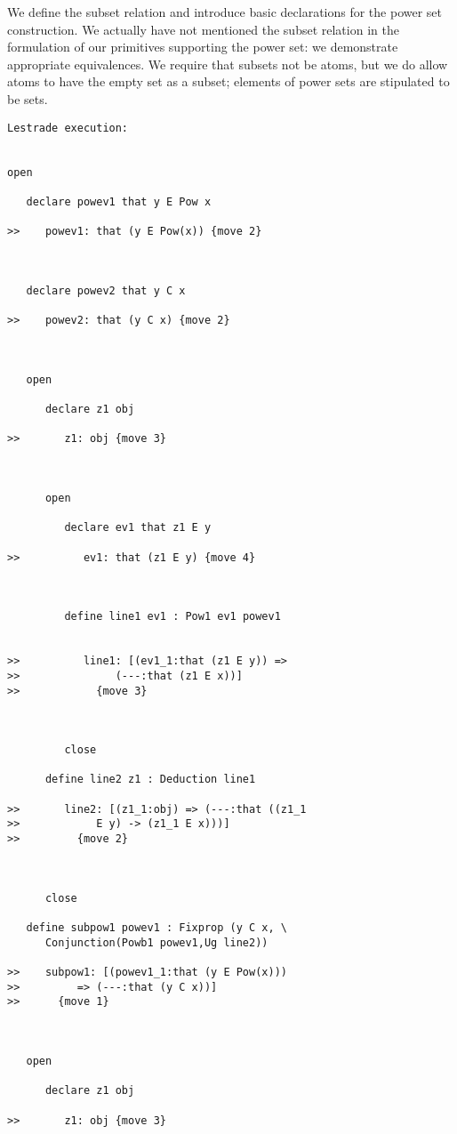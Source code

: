 \documentclass{article}
\begin{document}
We define the subset relation and introduce basic declarations for the power set construction.  We actually have not mentioned the subset relation
in the formulation of our primitives supporting the power set:  we demonstrate appropriate equivalences.  We require that subsets not be atoms, but we
do allow atoms to have the empty set as a subset;  elements of power sets are stipulated to be sets.

\begin{verbatim}Lestrade execution:


open

   declare powev1 that y E Pow x

>>    powev1: that (y E Pow(x)) {move 2}



   declare powev2 that y C x

>>    powev2: that (y C x) {move 2}



   open

      declare z1 obj

>>       z1: obj {move 3}



      open

         declare ev1 that z1 E y

>>          ev1: that (z1 E y) {move 4}



         define line1 ev1 : Pow1 ev1 powev1


>>          line1: [(ev1_1:that (z1 E y)) =>
>>               (---:that (z1 E x))]
>>            {move 3}



         close

      define line2 z1 : Deduction line1

>>       line2: [(z1_1:obj) => (---:that ((z1_1
>>            E y) -> (z1_1 E x)))]
>>         {move 2}



      close

   define subpow1 powev1 : Fixprop (y C x, \
      Conjunction(Powb1 powev1,Ug line2))

>>    subpow1: [(powev1_1:that (y E Pow(x)))
>>         => (---:that (y C x))]
>>      {move 1}



   open

      declare z1 obj

>>       z1: obj {move 3}




\end{verbatim}
\end{document}
